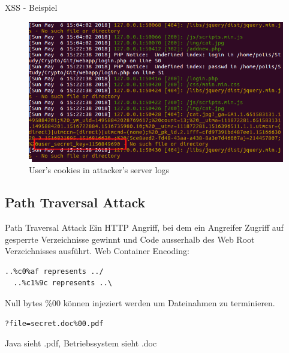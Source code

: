 \documentclass[10pt]{beamer}
\begin{document}
\begin{frame}[fragile]{XSS - Beispiel}
  \begin{figure}[ht]
      \centering
      \includegraphics[width=\textwidth]{XSS-3.png}
      \caption{User's cookies in attacker's server logs}
      \label{fig:figure3}
  \end{figure}
\end{frame}


\subsection{Path Traversal Attack}

\begin{frame}[fragile]{Path Traversal Attack}
  Ein HTTP Angriff, bei dem ein Angreifer Zugriff auf gesperrte Verzeichnisse gewinnt und Code ausserhalb des Web Root Verzeichnisses ausf\"uhrt.
  \newline
  \newline
  Web Container Encoding:
  \begin{lstlisting}[style=BashStyle]
  ..%c0%af represents ../
  ..%c1%9c represents ..\
  \end{lstlisting}

  Null bytes \%00 k\"onnen injeziert werden um Dateinahmen zu terminieren.
  \begin{lstlisting}[style=BashStyle]
  ?file=secret.doc%00.pdf
  \end{lstlisting}
  Java sieht .pdf, Betriebssystem sieht .doc
\end{frame}
\end{document}
